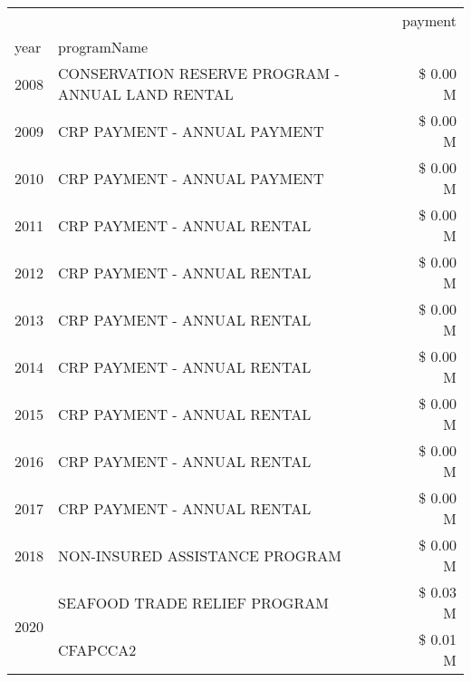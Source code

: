 \begin{tabular}{llr}
\toprule
 &  & payment \\
year & programName &  \\
\midrule
2008 & CONSERVATION RESERVE PROGRAM - ANNUAL LAND RENTAL & \$ 0.00 M \\
\cline{1-3}
2009 & CRP PAYMENT - ANNUAL PAYMENT & \$ 0.00 M \\
\cline{1-3}
2010 & CRP PAYMENT - ANNUAL PAYMENT & \$ 0.00 M \\
\cline{1-3}
2011 & CRP PAYMENT - ANNUAL RENTAL & \$ 0.00 M \\
\cline{1-3}
2012 & CRP PAYMENT - ANNUAL RENTAL & \$ 0.00 M \\
\cline{1-3}
2013 & CRP PAYMENT - ANNUAL RENTAL & \$ 0.00 M \\
\cline{1-3}
2014 & CRP PAYMENT - ANNUAL RENTAL & \$ 0.00 M \\
\cline{1-3}
2015 & CRP PAYMENT - ANNUAL RENTAL & \$ 0.00 M \\
\cline{1-3}
2016 & CRP PAYMENT - ANNUAL RENTAL & \$ 0.00 M \\
\cline{1-3}
2017 & CRP PAYMENT - ANNUAL RENTAL & \$ 0.00 M \\
\cline{1-3}
2018 & NON-INSURED ASSISTANCE PROGRAM & \$ 0.00 M \\
\cline{1-3}
\multirow[t]{2}{*}{2020} & SEAFOOD TRADE RELIEF PROGRAM & \$ 0.03 M \\
 & CFAPCCA2 & \$ 0.01 M \\
\cline{1-3}
\bottomrule
\end{tabular}

